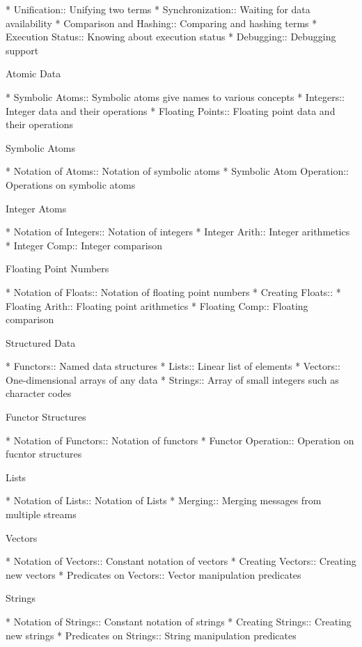 * Unification::                 Unifying two terms
* Synchronization::             Waiting for data availability
* Comparison and Hashing::      Comparing and hashing terms
* Execution Status::            Knowing about execution status
* Debugging::                   Debugging support

Atomic Data

* Symbolic Atoms::              Symbolic atoms give names to various concepts
* Integers::                    Integer data and their operations
* Floating Points::             Floating point data and their operations

Symbolic Atoms

* Notation of Atoms::           Notation of symbolic atoms
* Symbolic Atom Operation::     Operations on symbolic atoms

Integer Atoms

* Notation of Integers::        Notation of integers
* Integer Arith::               Integer arithmetics
* Integer Comp::                Integer comparison

Floating Point Numbers

* Notation of Floats::          Notation of floating point numbers
* Creating Floats::             
* Floating Arith::              Floating point arithmetics
* Floating Comp::               Floating comparison

Structured Data

* Functors::                    Named data structures
* Lists::                       Linear list of elements
* Vectors::                     One-dimensional arrays of any data
* Strings::                     Array of small integers such as character codes

Functor Structures

* Notation of Functors::        Notation of functors
* Functor Operation::           Operation on fucntor structures

Lists

* Notation of Lists::           Notation of Lists
* Merging::                     Merging messages from multiple streams

Vectors

* Notation of Vectors::         Constant notation of vectors
* Creating Vectors::            Creating new vectors
* Predicates on Vectors::       Vector manipulation predicates

Strings

* Notation of Strings::         Constant notation of strings
* Creating Strings::            Creating new strings
* Predicates on Strings::       String manipulation predicates

